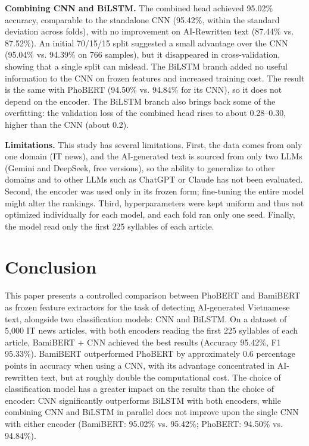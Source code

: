 \documentclass[conference,a4paper]{IEEEtran}
\begin{document}
\textbf{Combining CNN and BiLSTM.} The combined head achieved 95.02\% accuracy, comparable to the standalone CNN (95.42\%, within the standard deviation across folds), with no improvement on AI-Rewritten text (87.44\% vs. 87.52\%). An initial 70/15/15 split suggested a small advantage over the CNN (95.04\% vs. 94.39\% on 766 samples), but it disappeared in cross-validation, showing that a single split can mislead. The BiLSTM branch added no useful information to the CNN on frozen features and increased training cost. The result is the same with PhoBERT (94.50\% vs. 94.84\% for its CNN), so it does not depend on the encoder. The BiLSTM branch also brings back some of the overfitting: the validation loss of the combined head rises to about 0.28--0.30, higher than the CNN (about 0.2).

\textbf{Limitations.} This study has several limitations. First, the data comes from only one domain (IT news), and the AI-generated text is sourced from only two LLMs (Gemini and DeepSeek, free versions), so the ability to generalize to other domains and to other LLMs such as ChatGPT or Claude has not been evaluated. Second, the encoder was used only in its frozen form; fine-tuning the entire model might alter the rankings. Third, hyperparameters were kept uniform and thus not optimized individually for each model, and each fold ran only one seed. Finally, the model read only the first 225 syllables of each article.

\section{Conclusion}
\label{sec:conclusion}
This paper presents a controlled comparison between PhoBERT and BamiBERT as frozen feature extractors for the task of detecting AI-generated Vietnamese text, alongside two classification models: CNN and BiLSTM. On a dataset of 5,000 IT news articles, with both encoders reading the first 225 syllables of each article, BamiBERT + CNN achieved the best results (Accuracy 95.42\%, F1 95.33\%). BamiBERT outperformed PhoBERT by approximately 0.6 percentage points in accuracy when using a CNN, with its advantage concentrated in AI-rewritten text, but at roughly double the computational cost. The choice of classification model has a greater impact on the results than the choice of encoder: CNN significantly outperforms BiLSTM with both encoders, while combining CNN and BiLSTM in parallel does not improve upon the single CNN with either encoder (BamiBERT: 95.02\% vs. 95.42\%; PhoBERT: 94.50\% vs. 94.84\%).
\end{document}
